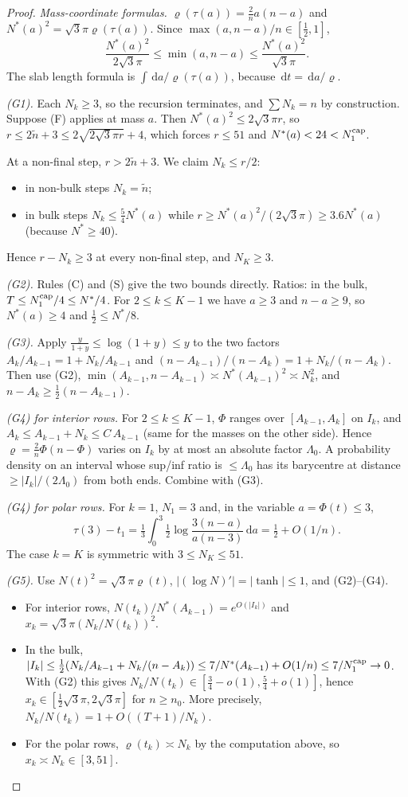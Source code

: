 \documentclass[11pt]{article}
\theoremstyle{definition}
\theoremstyle{remark}
\newcommand{\dd}{\,\mathrm d}
\begin{document}
\begin{proof}
\emph{Mass-coordinate formulas.} $\varrho(\tau(a))=\tfrac2na(n-a)$ and $N^*(a)^2=\sqrt3\pi\varrho(\tau(a))$.
Since $\max(a,n-a)/n\in[\tfrac12,1]$,
\[
\frac{N^*(a)^2}{2\sqrt3\pi}\le\min(a,n-a)\le\frac{N^*(a)^2}{\sqrt3\pi} .
\]
The slab length formula is $\int\dd a/\varrho(\tau(a))$, because $\dd t=\dd a/\varrho$.

\emph{(G1).} Each $N_k\ge3$, so the recursion terminates, and $\sum N_k=n$ by construction.
Suppose (F) applies at mass $a$. Then $N^*(a)^2\le2\sqrt3\pi r$, so
$r\le2\tilde n+3\le2\sqrt{2\sqrt3\pi r}+4$, which forces $r\le51$ and $N^*(a)<24<N_1^{\rm cap}$.

At a non-final step, $r>2\tilde n+3$. We claim $N_{k}\le r/2$:
\begin{itemize}[leftmargin=*]
\item in non-bulk steps $N_k=\tilde n$;
\item in bulk steps $N_k\le\tfrac54N^*(a)$ while $r\ge N^*(a)^2/(2\sqrt3\pi)\ge3.6N^*(a)$
  (because $N^*\ge40$).
\end{itemize}
Hence $r-N_k\ge3$ at every non-final step, and $N_K\ge3$.

\emph{(G2).} Rules (C) and (S) give the two bounds directly. Ratios: in the bulk,
$T\le N_1^{\rm cap}/4\le N^*/4$. For $2\le k\le K-1$ we have $a\ge3$ and $n-a\ge9$, so
$N^*(a)\ge4$ and $\tfrac12\le N^*/8$.

\emph{(G3).} Apply $\tfrac{y}{1+y}\le\log(1+y)\le y$ to the two factors
$A_k/A_{k-1}=1+N_k/A_{k-1}$ and $(n-A_{k-1})/(n-A_k)=1+N_k/(n-A_k)$. Then use (G2),
$\min(A_{k-1},n-A_{k-1})\asymp N^*(A_{k-1})^2\asymp N_k^2$, and $n-A_k\ge\tfrac12(n-A_{k-1})$.

\emph{(G4) for interior rows.} For $2\le k\le K-1$, $\Phi$ ranges over $[A_{k-1},A_k]$ on $I_k$, and
$A_k\le A_{k-1}+N_k\le C\,A_{k-1}$ (same for the masses on the other side). Hence
$\varrho=\tfrac2n\Phi(n-\Phi)$ varies on $I_k$ by at most an absolute factor $\Lambda_0$. A
probability density on an interval whose sup/inf ratio is $\le\Lambda_0$ has its barycentre at
distance $\ge|I_k|/(2\Lambda_0)$ from both ends. Combine with (G3).

\emph{(G4) for polar rows.} For $k=1$, $N_1=3$ and, in the variable $a=\Phi(t)\le3$,
\[
\tau(3)-t_1=\tfrac13\int_0^3\tfrac12\log\frac{3(n-a)}{a(n-3)}\dd a=\tfrac12+O(1/n).
\]
The case $k=K$ is symmetric with $3\le N_K\le51$.

\emph{(G5).} Use $N(t)^2=\sqrt3\pi\varrho(t)$, $|(\log N)'|=|\tanh|\le1$, and (G2)--(G4).
\begin{itemize}[leftmargin=*]
\item For interior rows, $N(t_k)/N^*(A_{k-1})=e^{O(|I_k|)}$ and
  $x_k=\sqrt3\pi(N_k/N(t_k))^2$.
\item In the bulk, $|I_k|\le\frac12(N_k/A_{k-1}+N_k/(n-A_k))\le 7/N^*(A_{k-1})+O(1/n)\le 7/N_1^{\rm cap}\to0$.
  With (G2) this gives $N_k/N(t_k)\in[\tfrac34-o(1),\tfrac54+o(1)]$, hence
  $x_k\in[\tfrac12\sqrt3\pi,2\sqrt3\pi]$ for $n\ge n_0$. More precisely,
  $N_k/N(t_k)=1+O((T+1)/N_k)$.
\item For the polar rows, $\varrho(t_k)\asymp N_k$ by the computation above, so
  $x_k\asymp N_k\in[3,51]$.
\end{itemize}


\end{proof}
\end{document}

